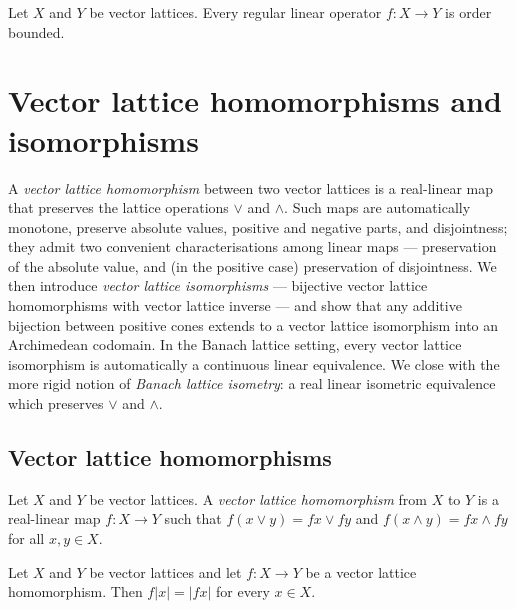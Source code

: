 \begin{theorem}
\label{thm:isRegularOp-isOrderBounded}
\leanok
{}
Let $X$ and $Y$ be vector lattices. Every regular linear operator
$f \colon X \to Y$ is order bounded.
\end{theorem}

\section{Vector lattice homomorphisms and isomorphisms}

A \emph{vector lattice homomorphism} between two vector lattices is
a real-linear map that preserves the lattice operations $\vee$ and
$\wedge$. Such maps are automatically monotone, preserve absolute
values, positive and negative parts, and disjointness; they admit
two convenient characterisations among linear maps — preservation
of the absolute value, and (in the positive case) preservation of
disjointness. We then introduce \emph{vector lattice isomorphisms}
— bijective vector lattice homomorphisms with vector lattice
inverse — and show that any additive bijection between positive
cones extends to a vector lattice isomorphism into an Archimedean
codomain. In the Banach lattice setting, every vector lattice
isomorphism is automatically a continuous linear equivalence. We
close with the more rigid notion of \emph{Banach lattice
isometry}: a real linear isometric equivalence which preserves
$\vee$ and $\wedge$.

\subsection{Vector lattice homomorphisms}

\begin{definition}
\label{def:vecLatHom}
\leanok
{}
Let $X$ and $Y$ be vector lattices. A \emph{vector lattice
homomorphism} from $X$ to $Y$ is a real-linear map $f \colon X
\to Y$ such that $f(x \vee y) = f x \vee f y$ and $f(x \wedge y) =
f x \wedge f y$ for all $x, y \in X$.
\end{definition}

\begin{lemma}
\label{lem:vecLatHom-map-abs}
\leanok
{}
Let $X$ and $Y$ be vector lattices and let $f \colon X \to Y$ be a
vector lattice homomorphism. Then $f \lvert x \rvert = \lvert f x
\rvert$ for every $x \in X$.
\end{lemma}

